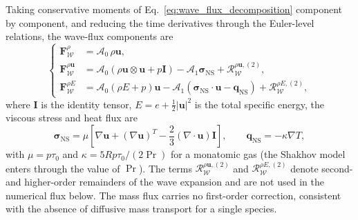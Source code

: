 \documentclass[preprint,12pt]{elsarticle}
\begin{document}
Taking conservative moments of Eq.~\eqref{eq:wave_flux_decomposition} component by component, and reducing the time derivatives through the Euler-level relations, the wave-flux components are
\begin{equation}\label{eq:wave_flux_components}
\left\{
\begin{aligned}
\mathbf F_{\mathcal{W}}^{\rho}
    &=\mathcal A_0\,\rho\boldsymbol{u},\\
\mathbf F_{\mathcal{W}}^{\rho\boldsymbol{u}}
    &=\mathcal A_0\left(\rho\boldsymbol{u}\otimes\boldsymbol{u}+p\mathbf I\right)
    -\mathcal A_1\boldsymbol{\sigma}_{\mathrm{NS}}
    +\mathcal R_{\mathcal{W}}^{\rho\boldsymbol{u},(2)},\\
\mathbf F_{\mathcal{W}}^{\rho E}
    &=\mathcal A_0\left(\rho E+p\right)\boldsymbol{u}
    -\mathcal A_1\left(\boldsymbol{\sigma}_{\mathrm{NS}}\cdot\boldsymbol{u}-\boldsymbol{q}_{\mathrm{NS}}\right)
    +\mathcal R_{\mathcal{W}}^{\rho E,(2)},
\end{aligned}
\right.
\end{equation}
where $\mathbf I$ is the identity tensor, $E=e+\frac{1}{2}|\boldsymbol{u}|^2$ is the total specific energy, the viscous stress and heat flux are
\begin{equation}\label{eq:ns_constitutive}
    \boldsymbol{\sigma}_{\mathrm{NS}}
    =
    \mu\left[\nabla\boldsymbol{u}+(\nabla\boldsymbol{u})^T-\frac{2}{3}(\nabla\cdot\boldsymbol{u})\mathbf I\right],
    \qquad
    \boldsymbol{q}_{\mathrm{NS}}=-\kappa\nabla T,
\end{equation}
with $\mu=p\tau_0$ and $\kappa=5Rp\tau_0/(2\Pr)$ for a monatomic gas (the Shakhov model enters through the value of $\Pr$). The terms $\mathcal R_{\mathcal{W}}^{\rho\boldsymbol{u},(2)}$ and $\mathcal R_{\mathcal{W}}^{\rho E,(2)}$ denote second- and higher-order remainders of the wave expansion and are not used in the numerical flux below. The mass flux carries no first-order correction, consistent with the absence of diffusive mass transport for a single species.
\end{document}
